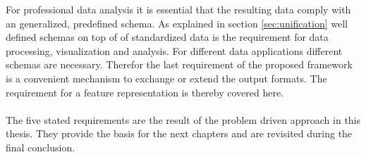 For professional data analysis it is essential that the resulting data comply with an generalized, predefined schema. As explained in section \ref{sec:unification} well defined schemas on top of of standardized data is the requirement for data processing, visualization and analysis. For different data applications different schemas are necessary. Therefor the last requirement of the proposed framework is a convenient mechanism to exchange or extend the output formats. The requirement for a feature representation is thereby covered here.
\\\\
The five stated requirements are the result of the problem driven approach in this thesis. They provide the basis for the next chapters and are revisited during the final conclusion.
